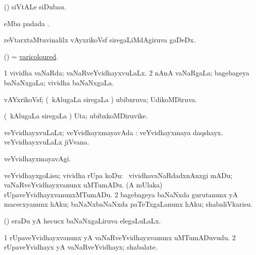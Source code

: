 \bentry
{} 
\gl{\nA}
\expl{}
\bmng
 (\veYshA) siVtALe siDubau. 
\emng
\eentry

\bentry
{} 
\gl{\nA}
\bmng
  eMba padada \bava. 
\emng
\eentry

\bentry
{} 
\gl{\nA}
\expl{}
\bmng
 reVtarxtaMtuvinalilx vAyxrikoVsf siregaLiMdAgiruva gaDeDx. 
\emng
\eentry

\bentry
{} 
\gl{\gu}
\expl{}
\bmng
 (\ame) = \hyperlink{varicoloured}{varicoloured}. 
\emng
\eentry

\bentry
{} 
\gl{\gu}
\expl{}
\bmng
\bnum
\num{1} vividha vaNaRda; vaNaRveYvidhayxvuLaLx. 
\num{2} nAnA vaNaRgaLa; bagebageya baNaNxgaLa; vividha baNaNxgaLa. 
\enum
\emng
\eentry

\bentry
{} 
\gl{\gu}
\expl{}
\bmng
 vAYxrikoVsf; (\kanmu\ kAlugaLa siregaLa \vi) ubibxruva; UdikoMDiruva. 
\emng
\eentry

\bentry
{} 
\gl{\nA}
\expl{}
\bmng
 (\kanmu\ kAlugaLa siregaLa \vi) Uta; ubibxkoMDiruvike. 
\emng
\eentry

\bentry
{} 
\gl{\gu}
\expl{}
\bmng
 veYvidhayxvuLaLx; veYvidhayxmayavAda :  veYvidhayxmaya daqshayx.  veYvidhayxvuLaLx jiVvana. 
\emng
\eentry

\bentry
{} 
\gl{\kirxvi}
\expl{}
\bmng
 veYvidhayxmayavAgi. 
\emng
\eentry

\bentry
{} 
\gl{\sakirx}
\expl{}
\bmng
\bnum
{} veYvidhayxgoLisu; vividha rUpa koDu: 
\banum
{} \kanmu\ vividhavaNaRdadxnAnxgi mADu; vaNaRveYvidhayxvanunx uMTumADu. 
 (A mUlaka) rUpaveYvidhayxvanunxMTumADu. 
\eanum
\numie
\num{2} bagebageya baNaNxda gurutanunx yA macecxyanunx hAku; baNaNxbaNaNxda paTeTxgaLanunx hAku; shabaliVkarisu. 
\enum
\emng
\eentry

\bentry
{} 
\gl{\gu}
\expl{}
\bmng
 (\savi) eraDu yA hecucx baNaNxgaLiruva elegaLuLaLx. 
\emng
\eentry

\bentry
{} 
\gl{\nA}
\expl{}
\bmng
\bnum
\num{1} rUpaveYvidhayxvanunx yA vaNaRveYvidhayxvanunx uMTumADuvudu. 
\num{2} rUpaveYvidhayx yA vaNaRveYvidhayx; shabalate. 
\enum
\emng
\eentry

